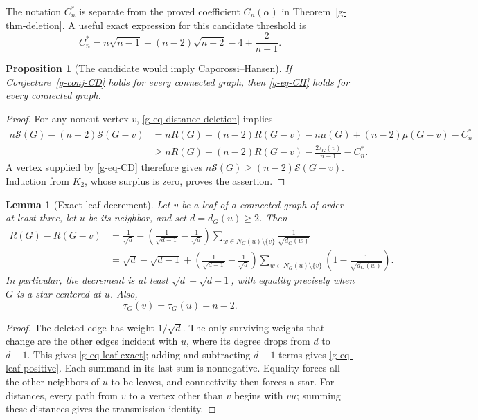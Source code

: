 \documentclass[11pt,a4paper]{article}
\newtheorem{lemma}[theorem]{Lemma}
\newtheorem{proposition}[theorem]{Proposition}
\theoremstyle{definition}
\theoremstyle{remark}
\begin{document}
The notation $C_n^*$ is separate from the proved coefficient
$C_n(\alpha)$ in Theorem~\ref{g-thm-deletion}.  A useful exact expression
for this candidate threshold is
\begin{equation}
 C_n^*=n\sqrt{n-1}-(n-2)\sqrt{n-2}-4+\frac2{n-1}.
 \label{g-eq-CD-threshold}
\end{equation}

\begin{proposition}[The candidate would imply Caporossi--Hansen]
\label{g-prop-CD-implies}
If Conjecture~\ref{g-conj-CD} holds for every connected graph, then
\eqref{g-eq-CH} holds for every connected graph.
\end{proposition}

\begin{proof}
For any noncut vertex $v$, \eqref{g-eq-distance-deletion} implies
\begin{align*}
 n\mathcal S(G)-(n-2)\mathcal S(G-v)
 &=nR(G)-(n-2)R(G-v)-n\mu(G)+(n-2)\mu(G-v)-C_n^*\\
 &\ge nR(G)-(n-2)R(G-v)-\frac{2\tau_G(v)}{n-1}-C_n^*.
\end{align*}
A vertex supplied by \eqref{g-eq-CD} therefore gives
$n\mathcal S(G)\ge(n-2)\mathcal S(G-v)$.  Induction from $K_2$, whose
surplus is zero, proves the assertion.
\end{proof}

\begin{lemma}[Exact leaf decrement]
\label{g-lem-leaf-decrement}
Let $v$ be a leaf of a connected graph of order at least three, let $u$
be its neighbor, and set $d=d_G(u)\ge2$.  Then
\begin{align}
 R(G)-R(G-v)
 &=\frac1{\sqrt d}
 -\left(\frac1{\sqrt{d-1}}-\frac1{\sqrt d}\right)
     \sum_{w\in N_G(u)\setminus\{v\}}\frac1{\sqrt{d_G(w)}}
 \label{g-eq-leaf-exact}\\
 &=\sqrt d-\sqrt{d-1}
 +\left(\frac1{\sqrt{d-1}}-\frac1{\sqrt d}\right)
    \sum_{w\in N_G(u)\setminus\{v\}}
       \left(1-\frac1{\sqrt{d_G(w)}}\right).
 \label{g-eq-leaf-positive}
\end{align}
In particular, the decrement is at least $\sqrt d-\sqrt{d-1}$, with
equality precisely when $G$ is a star centered at $u$.  Also,
\[
 \tau_G(v)=\tau_G(u)+n-2.
\]
\end{lemma}

\begin{proof}
The deleted edge has weight $1/\sqrt d$.  The only surviving weights
that change are the other edges incident with $u$, where its degree drops
from $d$ to $d-1$.  This gives \eqref{g-eq-leaf-exact}; adding and
subtracting $d-1$ terms gives \eqref{g-eq-leaf-positive}.  Each summand
in its last sum is nonnegative.  Equality forces all the other neighbors
of $u$ to be leaves, and connectivity then forces a star.  For distances,
every path from $v$ to a vertex other than $v$ begins with $vu$; summing
these distances gives the transmission identity.
\end{proof}
\end{document}
